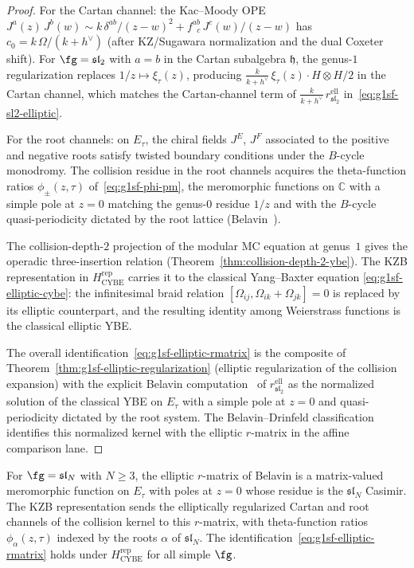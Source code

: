 \begin{proof}
For the Cartan channel: the Kac--Moody OPE
$J^a(z)\, J^b(w) \sim k\, \delta^{ab}/(z-w)^2 +
f^{ab}_{\;\;c}\, J^c(w)/(z-w)$ has $c_0 = k\,\Omega/(k + h^\vee)$
(after KZ/Sugawara normalization and the dual Coxeter shift). For
$\fg = \mathfrak{sl}_2$ with $a = b$ in the Cartan subalgebra
$\mathfrak{h}$, the genus-$1$ regularization replaces
$1/z \mapsto \xi_\tau(z)$, producing
$\frac{k}{k+h^\vee}\,\xi_\tau(z) \cdot H \otimes H/2$ in the
Cartan channel, which matches the Cartan-channel term of
$\frac{k}{k+h^\vee}\,r^{\mathrm{ell}}_{\mathfrak{sl}_2}$
in~\eqref{eq:g1sf-sl2-elliptic}.

For the root channels: on $E_\tau$, the chiral fields $J^E$, $J^F$
associated to the positive and negative roots satisfy twisted
boundary conditions under the $B$-cycle monodromy. The
collision residue in the root channels acquires the theta-function
ratios $\phi_\pm(z, \tau)$ of~\eqref{eq:g1sf-phi-pm}, the meromorphic
functions on $\mathbb{C}$ with a simple pole at $z=0$ matching the
genus-$0$ residue $1/z$ and with the $B$-cycle quasi-periodicity
dictated by the root lattice
(Belavin~\cite{Belavin81}).

The collision-depth-$2$ projection of the modular MC equation at
genus~$1$ gives the operadic three-insertion relation
\textup{(}Theorem~\ref{thm:collision-depth-2-ybe}\textup{)}.  The
KZB representation in $H_{\mathrm{CYBE}}^{\mathrm{rep}}$ carries it
to the classical Yang--Baxter equation
\eqref{eq:g1sf-elliptic-cybe}:
the infinitesimal braid relation
$[\Omega_{ij}, \Omega_{ik} + \Omega_{jk}] = 0$ is replaced by its
elliptic counterpart, and the resulting identity among Weierstrass
functions is the classical elliptic YBE.

The overall identification~\eqref{eq:g1sf-elliptic-rmatrix} is the
composite of Theorem~\ref{thm:g1sf-elliptic-regularization}
(elliptic regularization of the collision expansion) with the
explicit Belavin computation~\cite{Belavin81} of
$r^{\mathrm{ell}}_{\mathfrak{sl}_2}$ as the normalized solution of the
classical YBE on $E_\tau$ with a simple pole at $z=0$ and
quasi-periodicity dictated by the root system. The
Belavin--Drinfeld classification~\cite{BelavinDrinfeld82} identifies
this normalized kernel with the elliptic $r$-matrix in the affine
comparison lane.
\end{proof}

\begin{remark}
\label{rem:g1sf-higher-rank}
For $\fg = \mathfrak{sl}_N$ with $N \geq 3$, the elliptic
$r$-matrix of Belavin is a matrix-valued meromorphic function on
$E_\tau$ with poles at $z = 0$ whose residue is the $\mathfrak{sl}_N$
Casimir. The KZB representation sends the elliptically regularized
Cartan and root channels of the collision kernel to this $r$-matrix,
with theta-function ratios $\phi_\alpha(z, \tau)$ indexed by the
roots $\alpha$ of $\mathfrak{sl}_N$. The
identification~\eqref{eq:g1sf-elliptic-rmatrix} holds under
$H_{\mathrm{CYBE}}^{\mathrm{rep}}$ for all simple $\fg$.
\end{remark}

